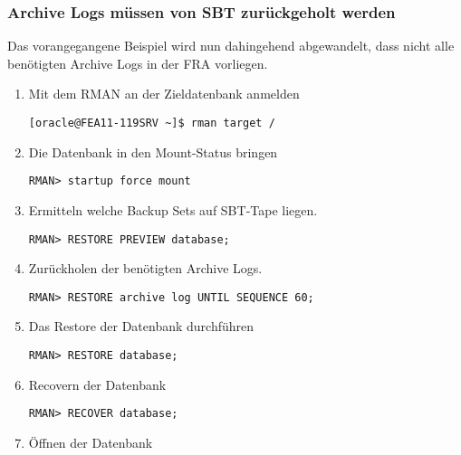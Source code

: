         \subsubsection{Archive Logs  müssen von SBT zurückgeholt werden}
          Das vorangegangene Beispiel wird nun dahingehend abgewandelt, dass nicht alle benötigten Archive Logs in der FRA vorliegen.
          \begin{enumerate}
            \item Mit dem RMAN an der Zieldatenbank anmelden
              \begin{lstlisting}[caption={An der Zieldatenbank anmelden},label=admin1445,language=rman]
[oracle@FEA11-119SRV ~]$ rman target /
              \end{lstlisting}
            \item Die Datenbank in den Mount-Status bringen
              \begin{lstlisting}[caption={Datenbank mounten},label=admin1446,language=rman,alsolanguage=sqlplus]
RMAN> startup force mount
            \end{lstlisting}
            \item Ermitteln welche Backup Sets auf SBT-Tape liegen.
              \begin{lstlisting}[caption={Ermitteln der benötigten Dateien},label=admin1447,language=rman]
RMAN> RESTORE PREVIEW database;
              \end{lstlisting}
            \item Zurückholen der benötigten Archive Logs.
              \begin{lstlisting}[caption={Restore der Archive Logs von SBT in die FRA},label=admin1448,language=rman]
RMAN> RESTORE archive log UNTIL SEQUENCE 60;
              \end{lstlisting}
            \item Das Restore der Datenbank durchführen
              \begin{lstlisting}[caption={Restore der Datendateien},label=admin1449,language=rman]
RMAN> RESTORE database;
              \end{lstlisting}
            \item Recovern der Datenbank
              \begin{lstlisting}[caption={Recovery der Datenbank},label=admin1450,language=rman]
RMAN> RECOVER database;
              \end{lstlisting}
            \item Öffnen der Datenbank
              \begin{lstlisting}[caption={Öffnen der Datenbank nach dem Recovery},label=admin1451,language=rman,emph={[10]ALTER,DATABASE,OPEN},emphstyle={[10]\color{magenta}\bfseries}]

\end{lstlisting}
\end{enumerate}
